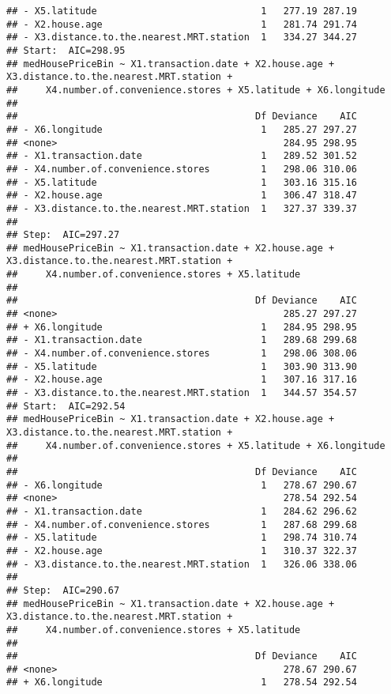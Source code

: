 \documentclass[
]{article}
\begin{document}
\begin{verbatim}
## - X5.latitude                             1   277.19 287.19
## - X2.house.age                            1   281.74 291.74
## - X3.distance.to.the.nearest.MRT.station  1   334.27 344.27
## Start:  AIC=298.95
## medHousePriceBin ~ X1.transaction.date + X2.house.age + X3.distance.to.the.nearest.MRT.station + 
##     X4.number.of.convenience.stores + X5.latitude + X6.longitude
## 
##                                          Df Deviance    AIC
## - X6.longitude                            1   285.27 297.27
## <none>                                        284.95 298.95
## - X1.transaction.date                     1   289.52 301.52
## - X4.number.of.convenience.stores         1   298.06 310.06
## - X5.latitude                             1   303.16 315.16
## - X2.house.age                            1   306.47 318.47
## - X3.distance.to.the.nearest.MRT.station  1   327.37 339.37
## 
## Step:  AIC=297.27
## medHousePriceBin ~ X1.transaction.date + X2.house.age + X3.distance.to.the.nearest.MRT.station + 
##     X4.number.of.convenience.stores + X5.latitude
## 
##                                          Df Deviance    AIC
## <none>                                        285.27 297.27
## + X6.longitude                            1   284.95 298.95
## - X1.transaction.date                     1   289.68 299.68
## - X4.number.of.convenience.stores         1   298.06 308.06
## - X5.latitude                             1   303.90 313.90
## - X2.house.age                            1   307.16 317.16
## - X3.distance.to.the.nearest.MRT.station  1   344.57 354.57
## Start:  AIC=292.54
## medHousePriceBin ~ X1.transaction.date + X2.house.age + X3.distance.to.the.nearest.MRT.station + 
##     X4.number.of.convenience.stores + X5.latitude + X6.longitude
## 
##                                          Df Deviance    AIC
## - X6.longitude                            1   278.67 290.67
## <none>                                        278.54 292.54
## - X1.transaction.date                     1   284.62 296.62
## - X4.number.of.convenience.stores         1   287.68 299.68
## - X5.latitude                             1   298.74 310.74
## - X2.house.age                            1   310.37 322.37
## - X3.distance.to.the.nearest.MRT.station  1   326.06 338.06
## 
## Step:  AIC=290.67
## medHousePriceBin ~ X1.transaction.date + X2.house.age + X3.distance.to.the.nearest.MRT.station + 
##     X4.number.of.convenience.stores + X5.latitude
## 
##                                          Df Deviance    AIC
## <none>                                        278.67 290.67
## + X6.longitude                            1   278.54 292.54

\end{verbatim}
\end{document}
